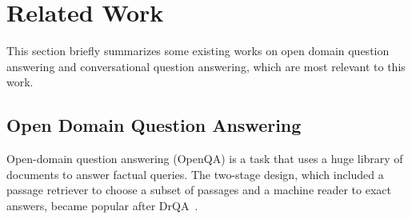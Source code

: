 \vspace{-0.1in}
\section{Related Work}\label{sec:related}

This section briefly summarizes some existing works on open domain question answering and conversational question answering, which are most relevant to this work.

\vspace{-0.1in}
\subsection{Open Domain Question Answering}
Open-domain question answering (OpenQA) \cite{voorhees1999trec} is a task that uses a huge library of documents to answer factual queries. The two-stage design, which included a passage retriever to choose a subset of passages and a machine reader to exact answers, became popular after DrQA~\cite{chen2017reading}.

